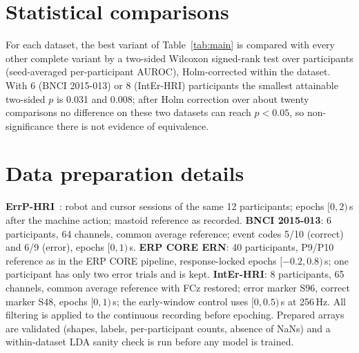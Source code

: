 \section{Statistical comparisons}
\label{app:stats}

For each dataset, the best variant of Table~\ref{tab:main} is compared with every other complete variant by a
two-sided Wilcoxon signed-rank test over participants (seed-averaged per-participant AUROC), Holm-corrected
within the dataset. With 6 (BNCI 2015-013) or 8 (IntEr-HRI) participants the smallest attainable two-sided
$p$ is 0.031 and 0.008; after Holm correction over about twenty comparisons no difference on these two datasets
can reach $p<0.05$, so non-significance there is not evidence of equivalence.

\begin{table}[h]
\centering
\caption{Best variant per dataset versus all others.}
\scriptsize

\end{table}

\begin{table}[h]
\centering
\caption{Best foundation model versus best compact network per dataset (paired Wilcoxon over participants,
uncorrected).}
\label{tab:fm}
\scriptsize
\resizebox{\linewidth}{!}{}
\end{table}

\section{Data preparation details}
\label{app:data}

\textbf{ErrP-HRI}~\citep{ehrlich2019feasibility}: robot and cursor sessions of the same 12 participants;
epochs $[0,2)$\,s after the machine action; mastoid reference as recorded. \textbf{BNCI 2015-013}: 6
participants, 64 channels, common average reference; event codes 5/10 (correct) and 6/9 (error), epochs
$[0,1)$\,s. \textbf{ERP CORE ERN}: 40 participants, P9/P10 reference as in the ERP CORE pipeline, response-locked
epochs $[-0.2,0.8)$\,s; one participant has only two error trials and is kept. \textbf{IntEr-HRI}: 8
participants, 65 channels, common average reference with FCz restored; error marker S96, correct marker S48,
epochs $[0,1)$\,s; the early-window control uses $[0,0.5)$\,s at 256\,Hz. All filtering is applied to the
continuous recording before epoching. Prepared arrays are validated (shapes, labels, per-participant counts,
absence of NaNs) and a within-dataset LDA sanity check is run before any model is trained.

